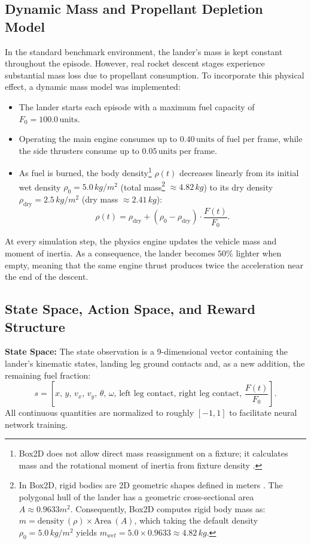 \subsection{Dynamic Mass and Propellant Depletion Model}
In the standard benchmark environment, the lander's mass is kept constant throughout the episode. However, real rocket descent stages experience substantial mass loss due to propellant consumption. To incorporate this physical effect, a dynamic mass model was implemented:
\begin{itemize}[leftmargin=*,label=$\bullet$]
    \item The lander starts each episode with a maximum fuel capacity of $F_0 = 100.0\,\text{units}$.
    \item Operating the main engine consumes up to $0.40\,\text{units}$ of fuel per frame, while the side thrusters consume up to $0.05\,\text{units}$ per frame.
    \item As fuel is burned, the body density\footnote{ Box2D does not allow direct mass reassignment on a fixture; it calculates mass and the rotational moment of inertia from fixture density \cite{box2d_manual}.} $\rho(t)$ decreases linearly from its initial wet density $\rho_0 = 5.0\,\si{kg/m^2}$ (total mass\footnote{In Box2D, rigid bodies are 2D geometric shapes defined in meters \cite{box2d_manual}. The polygonal hull of the lander has a geometric cross-sectional area $A \approx 0.9633 \si{m^2}$. Consequently, Box2D computes rigid body mass as: $m = \text{density}\ (\rho) \times \text{Area}\ (A)$, which taking the default density $\rho_0 = 5.0\, \si{kg/m^2}$ yields $ m_{wet} = 5.0 \times 0.9633 \approx 4.82\, \si{kg}$.} $\approx 4.82\,\si{kg}$) to its dry density $\rho_{\text{dry}} = 2.5\,\si{kg/m^2}$ (dry mass $\approx 2.41\,\si{kg}$):
          \begin{equation}
              \rho(t) = \rho_{\text{dry}} + (\rho_0 - \rho_{\text{dry}}) \cdot \frac{F(t)}{F_0}.
              \label{eq:density_scaling}
          \end{equation}
\end{itemize}
At every simulation step, the physics engine updates the vehicle mass and moment of inertia. As a consequence, the lander becomes $50\%$ lighter when empty, meaning that the same engine thrust produces twice the acceleration near the end of the descent.

\subsection{State Space, Action Space, and Reward Structure}
\textbf{State Space:} The state observation is a 9-dimensional vector containing the lander's kinematic states, landing leg ground contacts and, as a new addition, the remaining fuel fraction:
\begin{equation}
    s = \left[ x,\, y,\, v_x,\, v_y,\, \theta,\, \omega,\, \text{left leg contact},\, \text{right leg contact},\, \frac{F(t)}{F_0} \right].
    \label{eq:state_vector}
\end{equation}
All continuous quantities are normalized to roughly $[-1, 1]$ to facilitate neural network training.

